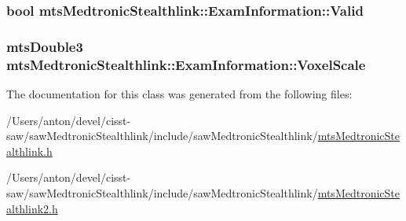 \subsubsection[{Valid}]{\setlength{\rightskip}{0pt plus 5cm}bool mts\+Medtronic\+Stealthlink\+::\+Exam\+Information\+::\+Valid}\label{classmts_medtronic_stealthlink_1_1_exam_information_af540507d17d3d78b0761c07449b0a10a}
\hypertarget{classmts_medtronic_stealthlink_1_1_exam_information_ab60d4354a0497fd3f9f9738ce9105808}{}
\subsubsection[{Voxel\+Scale}]{\setlength{\rightskip}{0pt plus 5cm}mts\+Double3 mts\+Medtronic\+Stealthlink\+::\+Exam\+Information\+::\+Voxel\+Scale}\label{classmts_medtronic_stealthlink_1_1_exam_information_ab60d4354a0497fd3f9f9738ce9105808}


The documentation for this class was generated from the following files\+:\begin{DoxyCompactItemize}
\item 
/\+Users/anton/devel/cisst-\/saw/saw\+Medtronic\+Stealthlink/include/saw\+Medtronic\+Stealthlink/\hyperlink{mts_medtronic_stealthlink_8h}{mts\+Medtronic\+Stealthlink.\+h}\item 
/\+Users/anton/devel/cisst-\/saw/saw\+Medtronic\+Stealthlink/include/saw\+Medtronic\+Stealthlink/\hyperlink{mts_medtronic_stealthlink2_8h}{mts\+Medtronic\+Stealthlink2.\+h}\end{DoxyCompactItemize}
